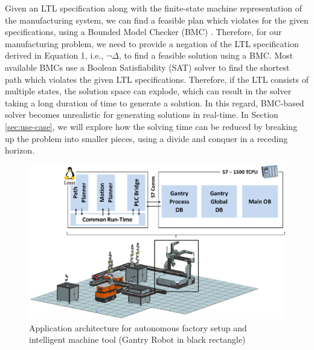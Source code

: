 \documentclass[3p,twocolumn,times,procedia]{elsarticle}
\begin{document}
Given an LTL specification along with the finite-state machine representation of the manufacturing system, we can find a feasible plan which violates for the given specifications, using a Bounded Model Checker (BMC) \cite{nusmv2}. Therefore, for our manufacturing problem, we need to provide a negation of the LTL specification derived in Equation 1, i.e., $\neg \Delta$, to find a feasible solution using a BMC. Most available BMCs use a Boolean Satisfiability (SAT) solver to find the shortest path which violates the given LTL specifications. Therefore, if the LTL consists of multiple states, the solution space can explode, which can result in the solver taking a long duration of time to generate a solution. In this regard, BMC-based solver becomes unrealistic for generating solutions in real-time. In Section \ref{sec:use-case}, we will explore how the solving time can be reduced by breaking up the problem into smaller pieces, using a divide and conquer in a receding horizon.

\begin{figure}[t!]\vspace*{4pt}
\centerline{\includegraphics[width=150mm,scale=0.5]{figure1_}}
\caption{Application architecture for autonomous factory setup and intelligent machine tool (Gantry Robot in black rectangle)}
\end{figure}
\vspace*{-10pt}
\end{document}
